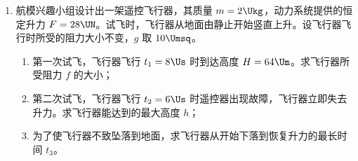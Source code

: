 \documentclass[\gkver]{gaokaozhenti}
\begin{document}
\begin{enumerate}
{	\textbf{B．}（1）根据爱因斯坦相对论，在任何参考系中，光速不变。D 项正确。

	（2）振动图象和波形图比较容易混淆，而导致出错，在读图时一定要注意横纵坐标的物理意义，以避免出错。题图为波的振动图象，由图象可知周期为 $4\Us$，波源的起振方向与波头的振动方向相同且向上，$t=6\Us$ 时质点在平衡位置向下振动，故 $8\Us$ 时质点在平衡位置向上振动；波传播到 B 点，需要时间 $t_{1}=\frac{x}{v}=\frac{16}{2}\Us=8\Us$，故 $t=9\Us$ 时，质点又振动了 $1\Us$（$\frac{1}{4}$ 个周期），处于正向最大位移处，位移为 $10\Ucm$。

	（3）根据题意能画出光路图，正确使用物像比是解决本题的关键。设照片圆形区域的实际半径为 $R$，运动员的实际长为 $L$，光路如图所示。折射定律 $n\sin\alpha=\sin90^{\circ}$，几何关系 $\sin\alpha=\frac{R}{\sqrt{R^{2}+h^{2}}}$，物像比 $\frac{R}{r}=\frac{L}{l}$，得 $h=\sqrt{n^{2}-1}\cdot\frac{L}{l}r$，取 $L=2.2\Um$，解得 $h=2.1\Um$。（本题为估算题，在取运动员实际长度时可以有一个范围，但要符合实际，故求得 $h$ 值可以不同，$1.6\sim2.6\Um$ 均可）

	\textbf{C．}（1）发生核反应前后，粒子的质量数和核电荷数均不变，据此可知中微子的质量数和电荷数都是 0，A 项正确。

	（2）产生的能量是由于质量亏损。两个电子转变为两个光子之后，质量变为零，由 $E=\Delta mc^{2}$，故一个光子的能量为 $\frac{E}{2}$，代入数据得 $\frac{E}{2}=8.2\times10^{-14}\UJ$。正电子与水中的电子相遇，与电子形成几乎静止的整体，故系统总动量为零，故如果只产生一个光子是不可能的，因为此过程遵循动量守恒。

	（3）物质波的波长为 $\lambda=\frac{h}{p}$，要比较波长需要将中子和电子的动量用动能表示出来即 $p=\sqrt{2mE_{k}}$，因为 $m_{e}<m_{n}$，所以 $p_{e}<p_{n}$，故 $\lambda_{n}<\lambda_{e}$。
}

\item
航模兴趣小组设计出一架遥控飞行器，其质量 $m=2\Ukg$，动力系统提供的恒定升力 $F=28\UN$。试飞时，飞行器从地面由静止开始竖直上升。设飞行器飞行时所受的阻力大小不变，$g$ 取 $10\Umsq$。
\begin{enumerate}
	\item
	第一次试飞，飞行器飞行 $t_{1}=8\Us$ 时到达高度 $H=64\Um$。求飞行器所受阻力 $f$ 的大小；
	\item
	第二次试飞，飞行器飞行 $t_{2}=6\Us$ 时遥控器出现故障，飞行器立即失去升力。求飞行器能达到的最大高度 $h$；
	\item
	为了使飞行器不致坠落到地面，求飞行器从开始下落到恢复升力的最长时间 $t_{3}$。
\end{enumerate}
\end{enumerate}
\end{document}

